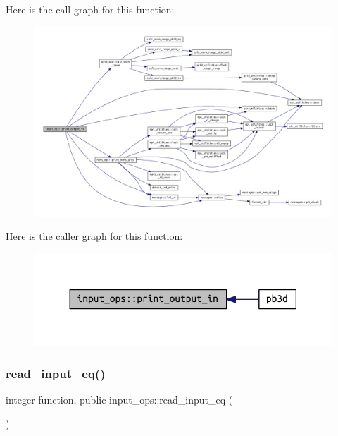 Here is the call graph for this function\+:
\nopagebreak
\begin{figure}[H]
\begin{center}
\leavevmode
\includegraphics[width=350pt]{namespaceinput__ops_a84ec7b3833da80ebb36ae0d5ff1a9e0a_cgraph}
\end{center}
\end{figure}
Here is the caller graph for this function\+:
\nopagebreak
\begin{figure}[H]
\begin{center}
\leavevmode
\includegraphics[width=330pt]{namespaceinput__ops_a84ec7b3833da80ebb36ae0d5ff1a9e0a_icgraph}
\end{center}
\end{figure}
\mbox{\label{namespaceinput__ops_a577c897cc266961eb40bb5ef747fa077}} 
\subsubsection{\texorpdfstring{read\+\_\+input\+\_\+eq()}{read\_input\_eq()}}
{\footnotesize\ttfamily integer function, public input\+\_\+ops\+::read\+\_\+input\+\_\+eq (\begin{DoxyParamCaption}{ }\end{DoxyParamCaption})}



